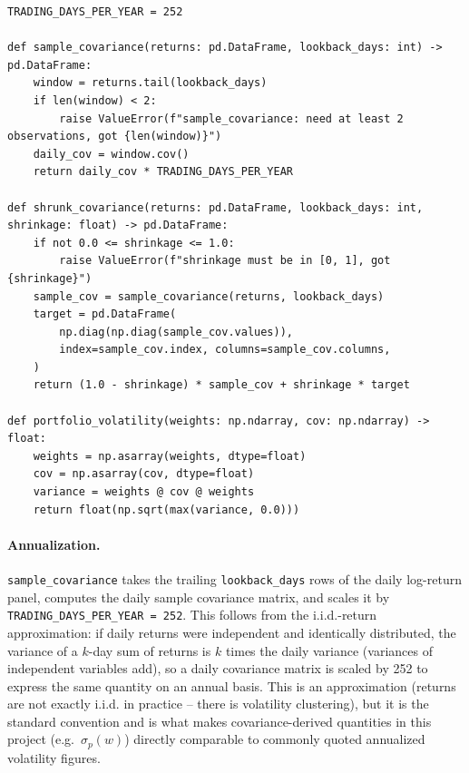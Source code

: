 \documentclass[11pt]{article}
\begin{document}
\begin{lstlisting}
TRADING_DAYS_PER_YEAR = 252

def sample_covariance(returns: pd.DataFrame, lookback_days: int) -> pd.DataFrame:
    window = returns.tail(lookback_days)
    if len(window) < 2:
        raise ValueError(f"sample_covariance: need at least 2 observations, got {len(window)}")
    daily_cov = window.cov()
    return daily_cov * TRADING_DAYS_PER_YEAR

def shrunk_covariance(returns: pd.DataFrame, lookback_days: int, shrinkage: float) -> pd.DataFrame:
    if not 0.0 <= shrinkage <= 1.0:
        raise ValueError(f"shrinkage must be in [0, 1], got {shrinkage}")
    sample_cov = sample_covariance(returns, lookback_days)
    target = pd.DataFrame(
        np.diag(np.diag(sample_cov.values)),
        index=sample_cov.index, columns=sample_cov.columns,
    )
    return (1.0 - shrinkage) * sample_cov + shrinkage * target

def portfolio_volatility(weights: np.ndarray, cov: np.ndarray) -> float:
    weights = np.asarray(weights, dtype=float)
    cov = np.asarray(cov, dtype=float)
    variance = weights @ cov @ weights
    return float(np.sqrt(max(variance, 0.0)))
\end{lstlisting}

\paragraph{Annualization.} \texttt{sample\_covariance} takes the trailing
\texttt{lookback\_days} rows of the daily log-return panel, computes the
daily sample covariance matrix, and scales it by
\texttt{TRADING\_DAYS\_PER\_YEAR = 252}. This follows from the
i.i.d.-return approximation: if daily returns were independent and
identically distributed, the variance of a $k$-day sum of returns is $k$
times the daily variance (variances of independent variables add), so a
daily covariance matrix is scaled by 252 to express the same quantity on
an annual basis. This is an approximation (returns are not exactly i.i.d.
in practice -- there is volatility clustering), but it is the standard
convention and is what makes covariance-derived quantities in this
project (e.g.\ $\sigma_p(w)$) directly comparable to commonly quoted
annualized volatility figures.
\end{document}
